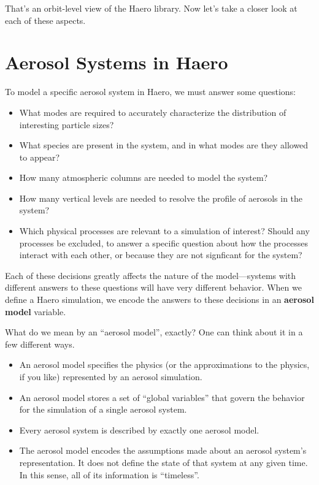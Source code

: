 That's an orbit-level view of the Haero library. Now let's take a closer look at
each of these aspects.

\section{Aerosol Systems in Haero}

To model a specific aerosol system in Haero, we must answer some questions:

\begin{itemize}
  \item What modes are required to accurately characterize the distribution of
        interesting particle sizes?
  \item What species are present in the system, and in what modes are they
        allowed to appear?
  \item How many atmospheric columns are needed to model the system?
  \item How many vertical levels are needed to resolve the profile of aerosols
        in the system?
  \item Which physical processes are relevant to a simulation of interest?
        Should any processes be excluded, to answer a specific question about
        how the processes interact with each other, or because they are not
        signficant for the system?
\end{itemize}

Each of these decisions greatly affects the nature of the model---systems with
different answers to these questions will have very different behavior. When we
define a Haero simulation, we encode the answers to these decisions in an
{\bf aerosol model} variable.

What do we mean by an ``aerosol model'', exactly? One can think about it in a
few different ways.

\begin{itemize}
  \item An aerosol model specifies the physics (or the approximations to the
        physics, if you like) represented by an aerosol simulation.
  \item An aerosol model stores a set of ``global variables'' that govern the
        behavior for the simulation of a single aerosol system.
  \item Every aerosol system is described by exactly one aerosol model.
  \item The aerosol model encodes the assumptions made about an aerosol system's
        representation. It does not define the state of that system at any given
        time. In this sense, all of its information is ``timeless''.
\end{itemize}

